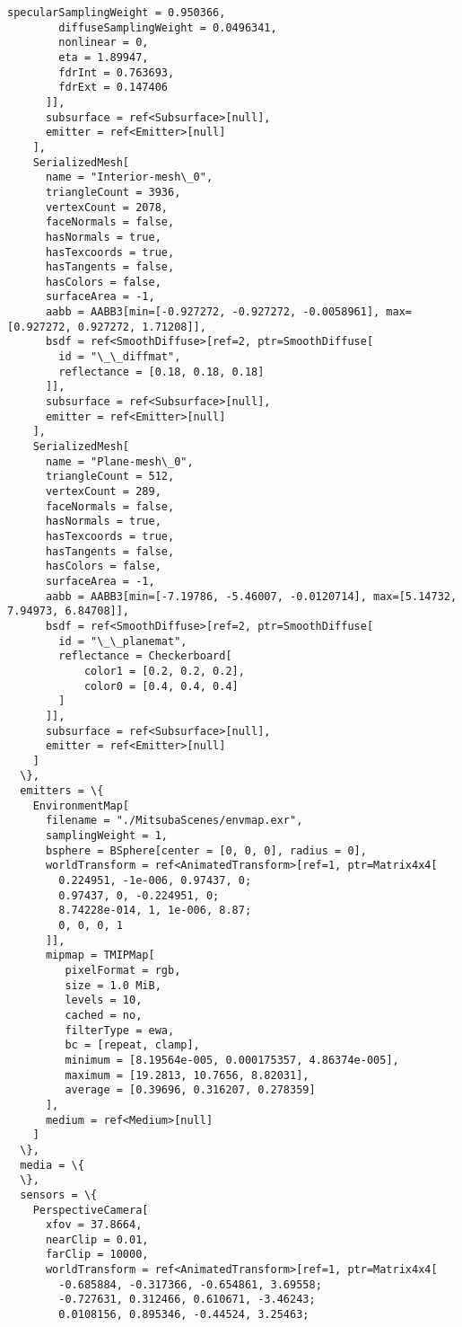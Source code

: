 \documentclass[11pt, a4paper, landscape]{scrartcl}
\begin{document}
\begin{Verbatim}[commandchars=\\\{\}]
        specularSamplingWeight = 0.950366,
        diffuseSamplingWeight = 0.0496341,
        nonlinear = 0,
        eta = 1.89947,
        fdrInt = 0.763693,
        fdrExt = 0.147406
      ]],
      subsurface = ref<Subsurface>[null],
      emitter = ref<Emitter>[null]
    ],
    SerializedMesh[
      name = "Interior-mesh\_0",
      triangleCount = 3936,
      vertexCount = 2078,
      faceNormals = false,
      hasNormals = true,
      hasTexcoords = true,
      hasTangents = false,
      hasColors = false,
      surfaceArea = -1,
      aabb = AABB3[min=[-0.927272, -0.927272, -0.0058961], max=[0.927272, 0.927272, 1.71208]],
      bsdf = ref<SmoothDiffuse>[ref=2, ptr=SmoothDiffuse[
        id = "\_\_diffmat",
        reflectance = [0.18, 0.18, 0.18]
      ]],
      subsurface = ref<Subsurface>[null],
      emitter = ref<Emitter>[null]
    ],
    SerializedMesh[
      name = "Plane-mesh\_0",
      triangleCount = 512,
      vertexCount = 289,
      faceNormals = false,
      hasNormals = true,
      hasTexcoords = true,
      hasTangents = false,
      hasColors = false,
      surfaceArea = -1,
      aabb = AABB3[min=[-7.19786, -5.46007, -0.0120714], max=[5.14732, 7.94973, 6.84708]],
      bsdf = ref<SmoothDiffuse>[ref=2, ptr=SmoothDiffuse[
        id = "\_\_planemat",
        reflectance = Checkerboard[
            color1 = [0.2, 0.2, 0.2],
            color0 = [0.4, 0.4, 0.4]
        ]
      ]],
      subsurface = ref<Subsurface>[null],
      emitter = ref<Emitter>[null]
    ]
  \},
  emitters = \{
    EnvironmentMap[
      filename = "./MitsubaScenes/envmap.exr",
      samplingWeight = 1,
      bsphere = BSphere[center = [0, 0, 0], radius = 0],
      worldTransform = ref<AnimatedTransform>[ref=1, ptr=Matrix4x4[
        0.224951, -1e-006, 0.97437, 0;
        0.97437, 0, -0.224951, 0;
        8.74228e-014, 1, 1e-006, 8.87;
        0, 0, 0, 1
      ]],
      mipmap = TMIPMap[
         pixelFormat = rgb,
         size = 1.0 MiB,
         levels = 10,
         cached = no,
         filterType = ewa,
         bc = [repeat, clamp],
         minimum = [8.19564e-005, 0.000175357, 4.86374e-005],
         maximum = [19.2813, 10.7656, 8.82031],
         average = [0.39696, 0.316207, 0.278359]
      ],
      medium = ref<Medium>[null]
    ]
  \},
  media = \{
  \},
  sensors = \{
    PerspectiveCamera[
      xfov = 37.8664,
      nearClip = 0.01,
      farClip = 10000,
      worldTransform = ref<AnimatedTransform>[ref=1, ptr=Matrix4x4[
        -0.685884, -0.317366, -0.654861, 3.69558;
        -0.727631, 0.312466, 0.610671, -3.46243;
        0.0108156, 0.895346, -0.44524, 3.25463;

\end{Verbatim}
\end{document}
